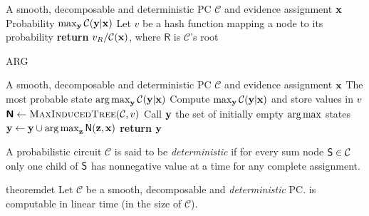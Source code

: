 \begin{algorithm}[t]
  \caption{\map}\label{alg:map}
  \begin{algorithmic}[1]
    \Require A smooth, decomposable and deterministic PC $\mathcal{C}$ and evidence assignment $\mathbf{x}$
    \Ensure Probability $\max_{\mathbf{y}}\mathcal{C}(\mathbf{y}|\mathbf{x})$
    \State Let $v$ be a hash function mapping a node to its probability
    \EndFor%
    \State \textbf{return} $v_{\normalfont{R}}/\mathcal{C}(\mathbf{x})$, where $\textsf{R}$ is
    $\mathcal{C}$'s root
  \end{algorithmic}
\end{algorithm}
\begin{algorithm}[t]
  \caption{\textsf{ARG}\map}\label{alg:argmap}
  \begin{algorithmic}[1]
    \Require A smooth, decomposable and deterministic PC $\mathcal{C}$ and evidence assignment $\mathbf{x}$
    \Ensure The most probable state $\operatorname*{\normalfont{arg\,max}}_{\mathbf{y}}\mathcal{C}(\mathbf{y}|\mathbf{x})$
    \State Compute $\max_{\mathbf{y}}\mathcal{C}(\mathbf{y}|\mathbf{x})$ and store values in $v$
    \State $\Nodes\gets\textproc{MaxInducedTree}(\mathcal{C}, v)$
    \State Call $\mathbf{y}$ the set of initially empty $\operatorname*{\normalfont{arg\,max}}$ states
      \State $\mathbf{y}\gets\mathbf{y}\cup\operatorname*{\normalfont{arg\,max}}_{\mathbf{z}}\operatorname{\textup{\textsf{N}}}(\mathbf{z},\mathbf{x})$%
    \EndFor%
    \State \textbf{return} $\mathbf{y}$
  \end{algorithmic}
\end{algorithm}

\begin{definition}[Determinism]
  A probabilistic circuit $\mathcal{C}$ is said to be \emph{deterministic} if for every sum node
  $\operatorname{\textup{\textsf{S}}}\in\mathcal{C}$ only one child of $\operatorname{\textup{\textsf{S}}}$ has nonnegative value at a time for any complete
  assignment.
\end{definition}

\begin{restatable}{theorem}{det}
  \label{thm:det}
  Let $\mathcal{C}$ be a smooth, decomposable and \emph{deterministic} PC. \map{} is computable in
  linear time (in the size of $\mathcal{C}$).
\end{restatable}

